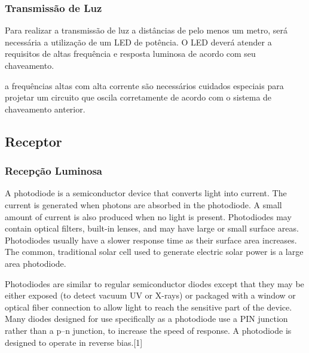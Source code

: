 	\subsubsection{Transmissão de Luz}
		
		Para realizar a transmissão de luz a distâncias de pelo menos um metro, será necessária a utilização de um LED de potência. O LED deverá atender a requisitos de altas frequência e resposta luminosa de acordo com seu chaveamento.
		

		 a frequências altas com alta corrente são necessários cuidados especiais para projetar um circuito que oscila corretamente de acordo com o sistema de chaveamento anterior.
		
	\subsection{Receptor}
	\subsubsection{Recepção Luminosa}
		
		A photodiode is a semiconductor device that converts light into current. The current is generated when photons are absorbed in the photodiode. A small amount of current is also produced when no light is present. Photodiodes may contain optical filters, built-in lenses, and may have large or small surface areas. Photodiodes usually have a slower response time as their surface area increases. The common, traditional solar cell used to generate electric solar power is a large area photodiode.
		
		Photodiodes are similar to regular semiconductor diodes except that they may be either exposed (to detect vacuum UV or X-rays) or packaged with a window or optical fiber connection to allow light to reach the sensitive part of the device. Many diodes designed for use specifically as a photodiode use a PIN junction rather than a p–n junction, to increase the speed of response. A photodiode is designed to operate in reverse bias.[1]

